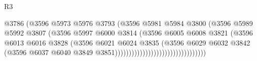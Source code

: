 \begin{lexlean}{R3}
\begin{coremodule}
                                                    @3786
                                                    (@3596
                                                      @5973
                                                      @5976
                                                      @3793
                                                      (@3596
                                                        @5981
                                                        @5984
                                                        @3800
                                                        (@3596
                                                          @5989
                                                          @5992
                                                          @3807
                                                          (@3596
                                                            @5997
                                                            @6000
                                                            @3814
                                                            (@3596
                                                              @6005
                                                              @6008
                                                              @3821
                                                              (@3596
                                                                @6013
                                                                @6016
                                                                @3828
                                                                (@3596
                                                                  @6021
                                                                  @6024
                                                                  @3835
                                                                  (@3596
                                                                    @6029
                                                                    @6032
                                                                    @3842
                                                                    (@3596
                                                                      @6037
                                                                      @6040
                                                                      @3849
                                                                      @3851)))))))))))))))))))))))))))))))))

\end{coremodule}
\end{lexlean}
